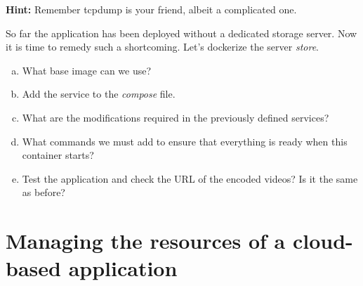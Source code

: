 \documentclass[a4paper,11pt]{exam}
\begin{document}
\begin{questions}
	\textbf{Hint:}
	Remember tcpdump is your friend, albeit a complicated one.
	
	\question So far the application has been deployed without a dedicated storage server. Now it is time to remedy such a shortcoming. Let's dockerize the server \textit{store}.
	
	\begin{enumerate}[(a)] %
		\item What base image can we use?
		\item Add the service to the \textit{compose} file.
		\item What are the modifications required in the previously defined services?
		\item What commands we must add to ensure that everything is ready when this container starts?
		\item Test the application and check the URL of the encoded videos? Is it the same as before? 
	\end{enumerate}
\end{questions}

\section{Managing the resources of a cloud-based application}
\end{document}
